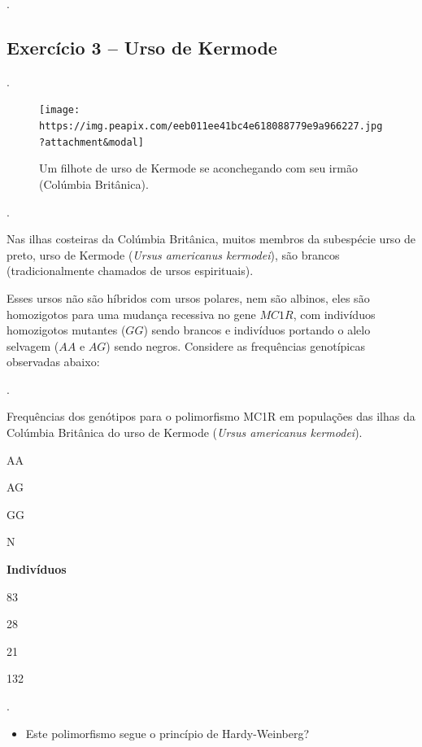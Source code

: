 \documentclass[
]{book}
\providecommand{\tightlist}{%
  \setlength{\itemsep}{0pt}\setlength{\parskip}{0pt}}
\begin{document}
.\linebreak

\hypertarget{exercuxedcio-3-urso-de-kermode}{%
\subsection{Exercício 3 -- Urso de Kermode}\label{exercuxedcio-3-urso-de-kermode}}

.\linebreak

\begin{figure}

{\centering \texttt{[image: https://img.peapix.com/eeb011ee41bc4e618088779e9a966227.jpg?attachment\&modal]} 

}

\caption{Um filhote de urso de Kermode se aconchegando com seu irmão (Colúmbia Britânica).}\label{fig:kermode}
\end{figure}

.\linebreak

Nas ilhas costeiras da Colúmbia Britânica, muitos membros da subespécie urso de preto, urso de Kermode (\emph{Ursus americanus kermodei}), são brancos (tradicionalmente chamados de ursos espirituais).

Esses ursos não são híbridos com ursos polares, nem são albinos, eles são homozigotos para uma mudança recessiva no gene \(MC1R\), com indivíduos homozigotos mutantes (\(GG\)) sendo brancos e indivíduos portando o alelo selvagem (\(AA\) e \(AG\)) sendo negros. Considere as frequências genotípicas observadas abaixo:

.\linebreak

\label{tab:tableB09}Frequências dos genótipos para o polimorfismo MC1R em populações das ilhas da Colúmbia Britânica do urso de Kermode (\emph{Ursus americanus kermodei}).

AA

AG

GG

N

\textbf{Indivíduos}

83

28

21

132

.\linebreak

\begin{itemize}
\tightlist
\item
  Este polimorfismo segue o princípio de Hardy-Weinberg?
\end{itemize}
\end{document}

